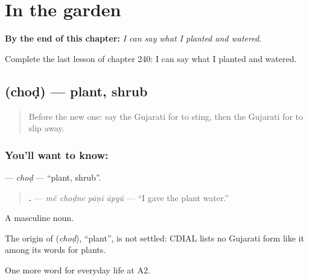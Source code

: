 
\chapter{In the garden}
\label{ch:gu-in-the-garden}

\begin{chapteropening}
\textbf{By the end of this chapter:} \emph{I can say what I planted and watered.}

Complete the last lesson of chapter 240: I can say what I planted and watered.
\end{chapteropening}

\section[\texorpdfstring{\gu{છોડ} (choḍ)}{છોડ (choḍ)}]{ (choḍ) — plant, shrub}

\label{lesson:GU-C240-chod}



\begin{quote}
Before the new one: say the Gujarati for to sting, then the Gujarati for to slip away.
\end{quote}

\subsection*{You'll want to know: }
\textbf{} — \emph{choḍ} — \textquotedblleft{}plant, shrub\textquotedblright{}.

\begin{quote}
\textbf{   .} — \emph{mẽ choḍne pāṇī āpyũ} — \textquotedblleft{}I gave the plant water.\textquotedblright{}
\end{quote}

A masculine noun.

\begin{cousinweb}
The origin of \textbf{} (\emph{choḍ}), \textquotedblleft{}plant\textquotedblright{}, is not settled: CDIAL lists no Gujarati form like it among its words for plants.
\end{cousinweb}

\begin{grammarlens}[title={What you've built}]
One more word for everyday life at A2.
\end{grammarlens}

